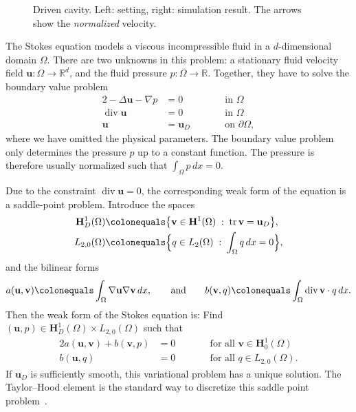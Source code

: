 \documentclass[a4paper,10pt,headings=normal,bibliography=totoc]{scrartcl}
\newcommand{\R}{\mathbb{R}}
\renewcommand{\div}{\operatorname{div}}
\begin{document}
\begin{figure}
\begin{center}
 \end{center}
 \caption{Driven cavity. Left: setting, right: simulation result.  The arrows show the {\em normalized} velocity.}
 \label{fig:dune_functions:driven_cavity}
\end{figure}

The Stokes equation models a viscous incompressible
fluid in a $d$-dimensional domain $\Omega$.  There are two unknowns in this problem: a stationary
fluid velocity field $\mathbf{u} : \Omega \to \R^d$, and the fluid pressure $p : \Omega \to \R$.
Together, they have to solve the boundary value problem
\begin{alignat*}{2}
 -\Delta \mathbf{u} - \nabla p & = 0  & \qquad & \text{in $\Omega$} \\
 \div \mathbf{u} & = 0                &        & \text{in $\Omega$} \\
                    \mathbf{u} & = \mathbf{u}_D  &        & \text{on $\partial \Omega$},
\end{alignat*}
where we have omitted the physical parameters.  The boundary value problem only determines the
pressure $p$ up to a constant function.  The pressure is therefore usually normalized such
that $\int_\Omega p\,dx = 0$.

Due to the constraint $\div \mathbf{u} = 0$, the corresponding weak form of the equation is a saddle-point problem.
Introduce the spaces
\begin{align*}
 \mathbf{H}^1_D(\Omega)
      & \colonequals
      \big\{ \mathbf{v} \in \mathbf{H}^1(\Omega) \; :\; \operatorname{tr}{\mathbf{v}} = \mathbf{u}_D \big\}, \\
 L_{2,0}(\Omega) & \colonequals  \Big\{ q \in L_2(\Omega) \; :\; \int_\Omega q\,dx = 0 \Big\},
\end{align*}
and the bilinear forms
\begin{equation*}
 a(\mathbf{u},\mathbf{v}) \colonequals \int_\Omega \nabla \mathbf{u} \nabla \mathbf{v} \,dx,
 \qquad \text{and} \qquad
 b(\mathbf{v},q) \colonequals \int_\Omega \div \mathbf{v} \cdot q \,dx.
\end{equation*}
Then the weak form of the Stokes equation is: Find $(\mathbf{u},p) \in \mathbf{H}_D^1(\Omega) \times L_{2,0}(\Omega)$ such that
\begin{alignat*}{2}
 a(\mathbf{u},\mathbf{v}) + b(\mathbf{v},p) & = 0 & \qquad & \text{for all $\mathbf{v} \in \mathbf{H}_0^1(\Omega)$} \\
 b(\mathbf{u},q)\qquad\qquad & = 0       &        & \text{for all $q \in L_{2,0}(\Omega)$}.
\end{alignat*}
If $\mathbf{u}_D$ is sufficiently smooth, this variational problem has a unique solution.
The Taylor--Hood element is the standard way to discretize this saddle point problem~\cite{braess:2013}.
\end{document}
